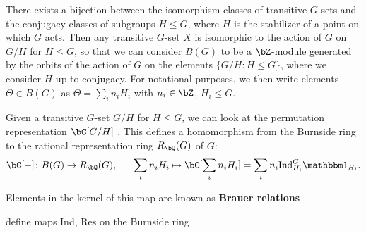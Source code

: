 There exists a bijection between the isomorphism classes of transitive $G$-sets and the conjugacy classes of subgroups $H \leq G$, where $H$ is the stabilizer of a point on which $G$ acts. Then any transitive $G$-set $X$ is isomorphic to the action of $G$ on $G/H$ for $H \leq G$, so that we can consider $B(G)$ to be a $\bZ$-module generated by the orbits of the action of $G$ on the elements $\{G/H : H \leq G\}$, where we consider $H$ up to conjugacy. For notational purposes, we then write elements $\Theta \in B(G)$ as $\Theta = \sum_i n_i H_i$ with $n_i \in \bZ$, $H_i \leq G$.

Given a transitive $G$-set $G/H$ for $H\leq G$, we can look at the permutation representation $\bC[G/H]$ . This defines a homomorphism from the Burnside ring to the rational representation ring $R_{\bQ}(G)$ of $G$: 
\[ \bC[-] \colon B(G) \to R_{\bQ}(G),  \ \ \ \ \ \sum_i n_i H_i \mapsto \bC[\sum_i n_i H_i ] = \sum_i n_i \Ind_{H_i}^G \trivial_{H_i}. \]

Elements in the kernel of this map are known as \textbf{Brauer relations}

{\color{red} define maps Ind, Res on the Burnside ring}